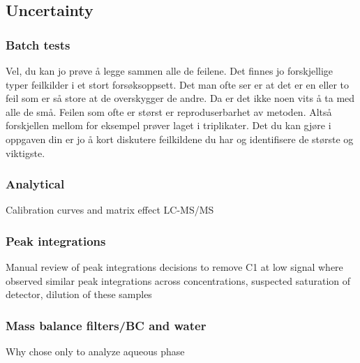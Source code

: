\subsection{Uncertainty}
\subsubsection{Batch tests}
Vel, du kan jo prøve å legge sammen alle de feilene. Det finnes jo forskjellige typer feilkilder i et stort forsøksoppsett. Det man ofte ser er at det er en eller to feil som er så store at de overskygger de andre. Da er det ikke noen vits å ta med alle de små. Feilen som ofte er størst er reproduserbarhet av metoden. Altså forskjellen mellom for eksempel prøver laget i triplikater. Det du kan gjøre i oppgaven din er jo å kort diskutere feilkildene du har og identifisere de største og viktigste.

\subsubsection{Analytical}
Calibration curves and matrix effect
LC-MS/MS

\subsubsection{Peak integrations}
Manual review of peak integrations
decisions to remove C1 at low signal
where observed similar peak integrations across concentrations, suspected saturation of detector, dilution of these samples

\subsubsection{Mass balance filters/BC and water}
Why chose only to analyze aqueous phase



